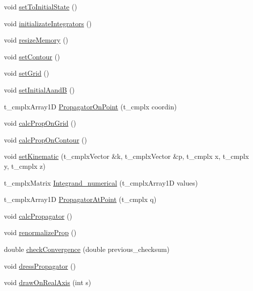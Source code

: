 \begin{DoxyCompactItemize}
\item 
void \hyperlink{class_c___quark_afe212ef0b9b354ce78670323f3110633}{set\-To\-Initial\-State} ()
\item 
void \hyperlink{class_c___quark_aff74305e3c468db6ec6cbd63e04fff9a}{initializate\-Integrators} ()
\item 
void \hyperlink{class_c___quark_a569aee23f1aafca5fe383ad4341df8e8}{resize\-Memory} ()
\item 
void \hyperlink{class_c___quark_a56f87c010401c5cd211cdd3edd53b2a0}{set\-Contour} ()
\item 
void \hyperlink{class_c___quark_aa5f4509e09ec22aae258b25dbf1cb328}{set\-Grid} ()
\item 
void \hyperlink{class_c___quark_a9bd2e345fa3034850454c5eae8ca585a}{set\-Initial\-Aand\-B} ()
\item 
t\-\_\-cmplx\-Array1\-D \hyperlink{class_c___quark_a80d1fb9d4107a67eae72c87e3653e7ef}{Propagator\-On\-Point} (t\-\_\-cmplx coordin)
\item 
void \hyperlink{class_c___quark_aed45d2fb4598cbb55b3fef5edcc6e826}{calc\-Prop\-On\-Grid} ()
\item 
void \hyperlink{class_c___quark_abade7bfefe26cdb91a1d8a8583879fff}{calc\-Prop\-On\-Contour} ()
\item 
void \hyperlink{class_c___quark_a3aa1d8e442cd1e051ed8e1deb37868e0}{set\-Kinematic} (t\-\_\-cmplx\-Vector \&k, t\-\_\-cmplx\-Vector \&p, t\-\_\-cmplx x, t\-\_\-cmplx y, t\-\_\-cmplx z)
\item 
t\-\_\-cmplx\-Matrix \hyperlink{class_c___quark_a9f6b8538c2c1b9af29a5c063b26ec7d8}{Integrand\-\_\-numerical} (t\-\_\-cmplx\-Array1\-D values)
\item 
t\-\_\-cmplx\-Array1\-D \hyperlink{class_c___quark_a3d1f0eafbded04e910a6576e6a9a079a}{Propagator\-At\-Point} (t\-\_\-cmplx q)
\item 
void \hyperlink{class_c___quark_a6e76c6b1d863858beed18f1c0d9e41d1}{calc\-Propagator} ()
\item 
void \hyperlink{class_c___quark_a5dc9671be863cde85f57705caaf11ee6}{renormalize\-Prop} ()
\item 
double \hyperlink{class_c___quark_ae755b4cd41dd4ce1a6dfd1c432d01bd1}{check\-Convergence} (double previous\-\_\-checksum)
\item 
void \hyperlink{class_c___quark_a9ab0f782b3d722eea50544e1101c00c5}{dress\-Propagator} ()
\item 
void \hyperlink{class_c___quark_af6aebddc61fe85aaf454e459d3de6283}{draw\-On\-Real\-Axis} (int s)
\item 

\end{DoxyCompactItemize}
